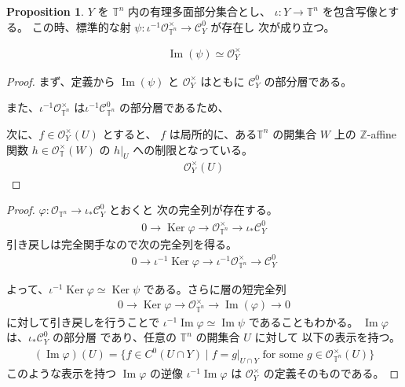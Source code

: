 \documentclass[a4paper,dvipdfmx,reqno,12pt]{amsart}
\theoremstyle{definition}
\newtheorem{proposition}[theorem]{Proposition}
\newcommand{\opn}[1]{\operatorname{#1}}
\numberwithin{equation}{section}
\begin{document}
\begin{proposition}
$Y$ を $\mathbb{T}^{n}$ 内の有理多面部分集合とし、
$\iota \colon Y\to \mathbb{T}^{n}$ を包含写像とする。
この時、標準的な射 $\psi \colon \iota^{-1}\mathcal{O}_{\mathbb{T}^{n}}^{\times}
\to \mathcal{C}^{0}_Y$ が存在し
次が成り立つ。

\begin{align}
\opn{Im}(\psi) \simeq 
\mathcal{O}_{Y}^{\times}
\end{align}

\end{proposition}
\begin{proof}
まず、定義から $\opn{Im}(\psi)$ と $\mathcal{O}_{Y}^{\times}$
はともに $\mathcal{C}^{0}_Y$ の部分層である。

また、$\iota^{-1}\mathcal{O}_{\mathbb{T}^{n}}^{\times}$
は$\iota^{-1}\mathcal{C}^{0}_{\mathbb{T}^{n}}$
の部分層であるため、


次に、$f\in \mathcal{O}_{Y}^{\times}(U)$ とすると、
$f$ は局所的に、ある$\mathbb{T}^{n}$ の開集合 
$W$ 上の $\mathbb{Z}$-affine 関数 $h\in 
\mathcal{O}_{\mathbb{T}}^{\times}(W)$ の
$h|_{U}$ への制限となっている。
\begin{align}
\mathcal{O}_{Y}^{\times}(U) 
\end{align}

\end{proof}

\begin{proof}

$\varphi \colon \mathcal{O}_{\mathbb{T}^{n}}\to 
\iota_*\mathcal{C}^{0}_Y$ とおくと
次の完全列が存在する。
\begin{align}
0 \to \opn{Ker} \varphi \to 
\mathcal{O}_{\mathbb{T}^{n}}^{\times} \to \iota_*\mathcal{C}^{0}_Y
\end{align}
引き戻しは完全関手なので次の完全列を得る。
\begin{align}
0 \to \iota^{-1}\opn{Ker} \varphi \to 
\iota^{-1}\mathcal{O}_{\mathbb{T}^{n}}^{\times} \to \mathcal{C}^{0}_Y
\end{align}

よって、$\iota^{-1}\opn{Ker} \varphi\simeq \opn{Ker}\psi$
である。さらに層の短完全列
\begin{align}
0 \to \opn{Ker} \varphi \to 
\mathcal{O}_{\mathbb{T}^{n}}^{\times} \to 
\opn{Im}(\varphi) \to 0 
\end{align}
に対して引き戻しを行うことで 
$\iota^{-1}\opn{Im} \varphi \simeq \opn{Im} \psi$
であることもわかる。
$\opn{Im} \varphi $は、$\iota_*\mathcal{C}^{0}_Y$ の部分層
であり、任意の $\mathbb{T}^{n}$ の開集合 $U$ に対して
以下の表示を持つ。
\begin{align}
(\opn{Im} \varphi)(U)
=\{ f\in C^{0}(U\cap Y)\mid f=g|_{U\cap Y}
\text{ for some } g\in \mathcal{O}^{\times}_{\mathbb{T}^{n}}(U) \}     
\end{align}
このような表示を持つ $\opn{Im} \varphi$ の逆像 
$\iota^{-1}\opn{Im} \varphi$ は 
$\mathcal{O}^{\times}_{Y}$ の定義そのものである。

\end{proof}
\end{document}
